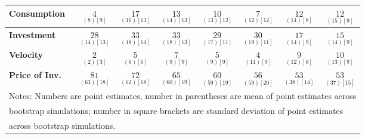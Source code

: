 \documentclass{article}
\begin{document}
\begin{tabular}{|l|c|@{}c|c|@{}c|c|@{}c|c|}
 \textbf{Consumption} & $\underset{(  8) [  9]}{  4}$ & $\underset{( 16) [ 13]}{ 17}$ & $\underset{( 14) [ 13]}{ 13}$ & $\underset{( 13) [ 12]}{ 10}$ & $\underset{( 12) [ 12]}{  7}$ & $\underset{( 14) [  8]}{ 12}$ & $\underset{( 15) [  9]}{ 12}$ \\ \hline 
 \textbf{Investment} & $\underset{( 14) [ 13]}{ 28}$ & $\underset{( 18) [ 14]}{ 33}$ & $\underset{( 18) [ 13]}{ 33}$ & $\underset{( 17) [ 11]}{ 29}$ & $\underset{( 19) [ 11]}{ 30}$ & $\underset{( 14) [  9]}{ 17}$ & $\underset{( 14) [  9]}{ 15}$ \\ \hline 
 \textbf{Velocity} & $\underset{(  2) [  3]}{  2}$ & $\underset{(  6) [  6]}{  5}$ & $\underset{(  9) [  9]}{  7}$ & $\underset{(  9) [  9]}{  5}$ & $\underset{( 11) [  9]}{  4}$ & $\underset{( 12) [  8]}{  9}$ & $\underset{( 13) [  9]}{ 10}$ \\ \hline 
 \textbf{Price of Inv.} & $\underset{( 63) [ 18]}{ 81}$ & $\underset{( 62) [ 18]}{ 72}$ & $\underset{( 60) [ 19]}{ 65}$ & $\underset{( 59) [ 19]}{ 60}$ & $\underset{( 59) [ 20]}{ 56}$ & $\underset{( 38) [ 14]}{ 53}$ & $\underset{( 37) [ 15]}{ 53}$ \\ \hline 
 \multicolumn{8}{|l|}{Notes: Numbers are point estimates, number in 
 parentheses are mean of point estimates across} \\ \hline 
 \multicolumn{8}{|l|}{bootstrap simulations; number in square brackets are 
 standard deviation of point estimates} \\ \hline 
 \multicolumn{8}{|l|}{across bootstrap simulations.} \\ \hline 
 \end{tabular} 
\end{document}
